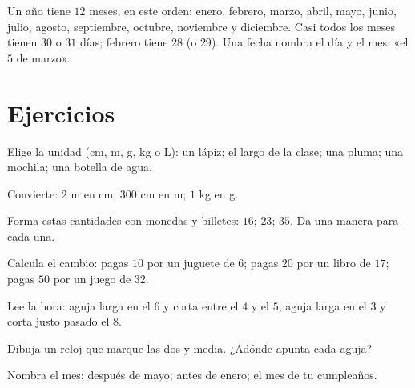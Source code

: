 \begin{example}[El calendario]\label{ex:g2:measure:calendar}
Un año tiene $12$ meses, en este orden: enero, febrero, marzo, abril,
mayo, junio, julio, agosto, septiembre, octubre, noviembre y diciembre.
Casi todos los meses tienen $30$ o $31$ días; febrero tiene $28$ (o $29$).
Una fecha nombra el día y el mes: «el $5$ de marzo».
\end{example}

\section{Ejercicios}

\begin{exercise}[$\star$]\label{exo:g2:measure:1}
Elige la unidad (cm, m, g, kg o L): un lápiz; el largo de la
clase; una pluma; una mochila; una botella de agua.
\end{exercise}

\begin{exercise}[$\star$]\label{exo:g2:measure:2}
Convierte: $2$ m en cm; $300$ cm en m; $1$ kg en g.
\end{exercise}

\begin{exercise}[$\star$]\label{exo:g2:measure:3}
Forma estas cantidades con monedas y billetes: $16$; \quad $23$; \quad
$35$. Da una manera para cada una.
\end{exercise}

\begin{exercise}[$\star$]\label{exo:g2:measure:4}
Calcula el cambio: pagas $10$ por un juguete de $6$; pagas $20$ por un libro
de $17$; pagas $50$ por un juego de $32$.
\end{exercise}

\begin{exercise}[$\star$]\label{exo:g2:measure:5}
Lee la hora: aguja larga en el $6$ y corta entre el $4$ y el $5$;
aguja larga en el $3$ y corta justo pasado el $8$.
\end{exercise}

\begin{exercise}[$\star$]\label{exo:g2:measure:6}
Dibuja un reloj que marque las dos y media. ¿Adónde apunta cada aguja?
\end{exercise}

\begin{exercise}[$\star$]\label{exo:g2:measure:7}
Nombra el mes: después de mayo; antes de enero; el mes de tu
cumpleaños.
\end{exercise}

